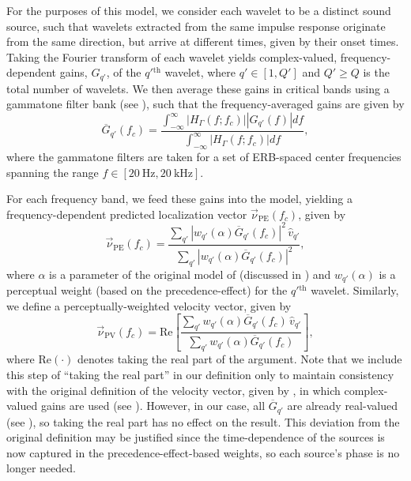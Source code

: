 For the purposes of this model, we consider each wavelet to be a distinct sound source, such that wavelets extracted from the same impulse response originate from the same direction, but arrive at different times, given by their onset times.
Taking the Fourier transform of each wavelet yields complex-valued, frequency-dependent gains, $G_{q'}$, of the $q'{}^\text{th}$ wavelet, where $q' \in [1,Q']$ and $Q' \geq Q$ is the total number of wavelets.
We then average these gains in critical bands using a gammatone filter bank (see ),
such that the frequency-averaged gains are given by
\begin{equation}\label{eq:05_Proposed_Models:Localization_Model:FreqAvg_Gain}
\overline{G}_{q'}(f_c) = \frac{\displaystyle \int_{-\infty}^\infty |H_\Gamma(f;f_c)| |G_{q'}(f)| df}{\displaystyle \int_{-\infty}^\infty |H_\Gamma(f;f_c)| df},
\end{equation}
where the gammatone filters are taken for a set of ERB-spaced center frequencies spanning the range $f \in [20~\text{Hz}, 20~\text{kHz}]$.

For each frequency band, we feed these gains into the model, yielding a frequency-dependent predicted localization vector $\vec{\nu}_\textrm{PE}(f_c)$, given by
\begin{equation}\label{eq:05_Proposed_Models:PE_Energy_Vector}
\vec{\nu}_{\textrm{PE}}(f_c) = \frac{ \sum_{q'} |w_{q'}(\alpha) \overline{G}_{q'}(f_c)|^2 \, \hat{v}_{q'}}{ \sum_{q'} |w_{q'}(\alpha) \overline{G}_{q'}(f_c)|^2},
\end{equation}
where $\alpha$ is a parameter of the original model of \citet{Stitt2016} (discussed in ) and $w_{q'}(\alpha)$ is a perceptual weight (based on the precedence-effect) for the $q'{}^\text{th}$ wavelet.
Similarly, we define a perceptually-weighted velocity vector, given by
\begin{equation}\label{eq:PE_Velocity_Vector}
\vec{\nu}_{\textrm{PV}}(f_c) = \text{Re} \left[ \frac{ \sum_{q'} w_{q'}(\alpha) \overline{G}_{q'}(f_c) \, \hat{v}_{q'}}{ \sum_{q'} w_{q'}(\alpha) \overline{G}_{q'}(f_c)} \right],
\end{equation}
where $\text{Re}(\cdot)$ denotes taking the real part of the argument.
Note that we include this step of ``taking the real part'' in our definition only to maintain consistency with the original definition of the velocity vector, given by \citet[section 4]{Gerzon1992}, in which complex-valued gains are used (see ).
However, in our case, all $\overline{G}_{q'}$ are already real-valued (see ), so taking the real part has no effect on the result.
This deviation from the original definition may be justified since the time-dependence of the sources is now captured in the precedence-effect-based weights, so each source's phase is no longer needed.


